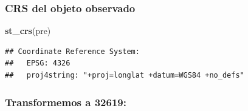 \documentclass[11pt,]{article}
\newenvironment{Shaded}{\begin{snugshade}}{\end{snugshade}}
\newcommand{\KeywordTok}[1]{\textcolor[rgb]{0.13,0.29,0.53}{\textbf{#1}}}
\newcommand{\DataTypeTok}[1]{\textcolor[rgb]{0.13,0.29,0.53}{#1}}
\newcommand{\DecValTok}[1]{\textcolor[rgb]{0.00,0.00,0.81}{#1}}
\newcommand{\StringTok}[1]{\textcolor[rgb]{0.31,0.60,0.02}{#1}}
\newcommand{\OperatorTok}[1]{\textcolor[rgb]{0.81,0.36,0.00}{\textbf{#1}}}
\newcommand{\NormalTok}[1]{#1}
\begin{document}
\subsubsection{CRS del objeto observado}\label{crs-del-objeto-observado}

\begin{Shaded}
\begin{Highlighting}[]
\KeywordTok{st_crs}\NormalTok{(pre)}
\end{Highlighting}
\end{Shaded}

\begin{verbatim}
## Coordinate Reference System:
##   EPSG: 4326 
##   proj4string: "+proj=longlat +datum=WGS84 +no_defs"
\end{verbatim}

\subsubsection{Transformemos a 32619:}\label{transformemos-a-32619}

\begin{Shaded}
\end{Shaded}
\end{document}
